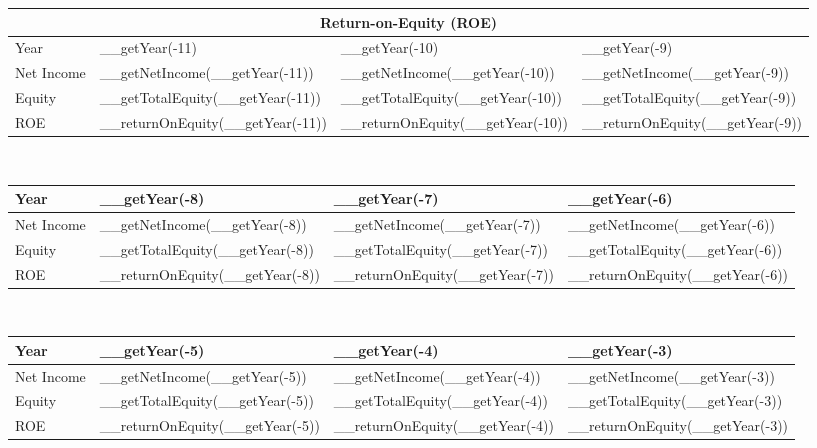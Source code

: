 \begin{tabularx}{\textwidth}{|X|X|X|X|}
 \hline
 \multicolumn{4}{|c|}{Return-on-Equity (ROE)} \\
 \hline
 Year                     & __getYear(-11)                   & __getYear(-10)                   & __getYear(-9)                   \\
 \hline
 Net Income               & __getNetIncome(__getYear(-11))   & __getNetIncome(__getYear(-10))   & __getNetIncome(__getYear(-9))   \\
 Equity                   & __getTotalEquity(__getYear(-11)) & __getTotalEquity(__getYear(-10)) & __getTotalEquity(__getYear(-9)) \\
 \rowcolor{lightgray} ROE & __returnOnEquity(__getYear(-11)) & __returnOnEquity(__getYear(-10)) & __returnOnEquity(__getYear(-9)) \\
 \hline
\end{tabularx}\\

\begin{tabularx}{\textwidth}{|X|X|X|X|}
 \hline
 Year                     & __getYear(-8)                   & __getYear(-7)                   & __getYear(-6)                   \\
 \hline
 Net Income               & __getNetIncome(__getYear(-8))   & __getNetIncome(__getYear(-7))   & __getNetIncome(__getYear(-6))   \\
 Equity                   & __getTotalEquity(__getYear(-8)) & __getTotalEquity(__getYear(-7)) & __getTotalEquity(__getYear(-6)) \\
 \rowcolor{lightgray} ROE & __returnOnEquity(__getYear(-8)) & __returnOnEquity(__getYear(-7)) & __returnOnEquity(__getYear(-6)) \\
 \hline
\end{tabularx}\\

\begin{tabularx}{\textwidth}{|X|X|X|X|}
 \hline
 Year                     & __getYear(-5)                   & __getYear(-4)                   & __getYear(-3)                   \\
 \hline
 Net Income               & __getNetIncome(__getYear(-5))   & __getNetIncome(__getYear(-4))   & __getNetIncome(__getYear(-3))   \\
 Equity                   & __getTotalEquity(__getYear(-5)) & __getTotalEquity(__getYear(-4)) & __getTotalEquity(__getYear(-3)) \\
 \rowcolor{lightgray} ROE & __returnOnEquity(__getYear(-5)) & __returnOnEquity(__getYear(-4)) & __returnOnEquity(__getYear(-3)) \\
 \hline
\end{tabularx}\\

